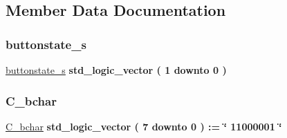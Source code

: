 \subsection{Member Data Documentation}
\mbox{\label{classcalc__ctrl_1_1rtl_af28493abe45f5efc5d9964a4858da804}} 
\subsubsection{\texorpdfstring{buttonstate\+\_\+s}{buttonstate\_s}}
{\footnotesize\ttfamily \hyperlink{classcalc__ctrl_1_1rtl_af28493abe45f5efc5d9964a4858da804}{buttonstate\+\_\+s} {\bfseries \textcolor{comment}{std\+\_\+logic\+\_\+vector}\textcolor{vhdlchar}{ }\textcolor{vhdlchar}{(}\textcolor{vhdlchar}{ }\textcolor{vhdlchar}{ } \textcolor{vhdldigit}{1} \textcolor{vhdlchar}{ }\textcolor{keywordflow}{downto}\textcolor{vhdlchar}{ }\textcolor{vhdlchar}{ } \textcolor{vhdldigit}{0} \textcolor{vhdlchar}{ }\textcolor{vhdlchar}{)}\textcolor{vhdlchar}{ }} \hspace{0.3cm}{\ttfamily [Signal]}}

\mbox{\label{classcalc__ctrl_1_1rtl_a4eee52e4f1c421f84974bd2e35d180c5}} 
\subsubsection{\texorpdfstring{C\+\_\+bchar}{C\_bchar}}
{\footnotesize\ttfamily \hyperlink{classcalc__ctrl_1_1rtl_a4eee52e4f1c421f84974bd2e35d180c5}{C\+\_\+bchar} {\bfseries \textcolor{comment}{std\+\_\+logic\+\_\+vector}\textcolor{vhdlchar}{ }\textcolor{vhdlchar}{(}\textcolor{vhdlchar}{ }\textcolor{vhdlchar}{ } \textcolor{vhdldigit}{7} \textcolor{vhdlchar}{ }\textcolor{keywordflow}{downto}\textcolor{vhdlchar}{ }\textcolor{vhdlchar}{ } \textcolor{vhdldigit}{0} \textcolor{vhdlchar}{ }\textcolor{vhdlchar}{)}\textcolor{vhdlchar}{ }\textcolor{vhdlchar}{ }\textcolor{vhdlchar}{ }\textcolor{vhdlchar}{\+:}\textcolor{vhdlchar}{=}\textcolor{vhdlchar}{ }\textcolor{vhdlchar}{ }\textcolor{vhdlchar}{ }\textcolor{vhdlchar}{ }\textcolor{keyword}{\char`\"{} 11000001 \char`\"{}}\textcolor{vhdlchar}{ }} \hspace{0.3cm}{\ttfamily [Constant]}}


